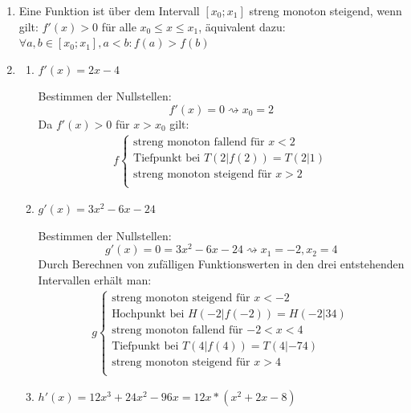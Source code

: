 \begin{lsg}{}
	\begin{enumerate}
		\item Eine Funktion ist über dem Intervall $[x_0;x_1]$ streng monoton steigend, wenn gilt: $f'(x)>0$ für alle $x_0\leq x \leq x_1$, äquivalent dazu: $\forall a,b\in[x_0;x_1], a<b : f(a)>f(b)$
		\item
		\begin{enumerate}
			\item $f'(x)=2x-4$

			Bestimmen der Nullstellen:
			\begin{equation*}
				f'(x)=0 \rightsquigarrow x_0=2
			\end{equation*}
			Da $f'(x)>0$ für $x>x_0$ gilt:
			\begin{align*}
				f \begin{cases}
					\text{streng monoton fallend für $x<2$}\\
					\text{Tiefpunkt bei $T(2|f(2))=T(2|1)$}\\
					\text{streng monoton steigend für $x>2$}\\
				\end{cases}
			\end{align*}
			\item $g'(x)=3x^2-6x-24$

			Bestimmen der Nullstellen:
			\begin{equation*}
				g'(x)=0=3x^2-6x-24 \rightsquigarrow x_1=-2 ,x_2=4
			\end{equation*}
			Durch Berechnen von zufälligen Funktionswerten in den drei entstehenden Intervallen erhält man:
			\begin{align*}
				g \begin{cases}
					\text{streng monoton steigend für $x<-2$}\\
					\text{Hochpunkt bei $H(-2|f(-2))=H(-2|34)$}\\
					\text{streng monoton fallend für $-2<x<4$}\\
					\text{Tiefpunkt bei $T(4|f(4))=T(4|-74)$}\\
					\text{streng monoton steigend für $x>4$}\\
				\end{cases}
			\end{align*}
			\item $h'(x)=12x^3+24x^2-96x=12x*(x^2+2x-8)$


\end{enumerate}
\end{enumerate}
\end{lsg}
